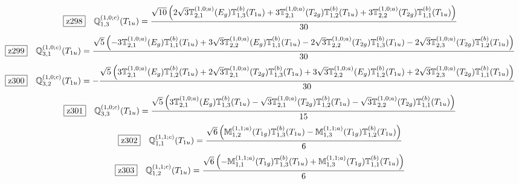 \documentclass[fleqn,10pt,landscape]{jsarticle}
\begin{document}
\begin{dmath*}
\hspace*{3mm}\fbox{z298}\quad \mathbb{Q}_{1,3}^{(1,0;c)}(T_{1u})=\frac{\sqrt{10} \left(2 \sqrt{3} \mathbb{T}_{2,1}^{(1,0;a)}(E_{g}) \mathbb{T}_{1,3}^{(b)}(T_{1u}) + 3 \mathbb{T}_{2,1}^{(1,0;a)}(T_{2g}) \mathbb{T}_{1,2}^{(b)}(T_{1u}) + 3 \mathbb{T}_{2,2}^{(1,0;a)}(T_{2g}) \mathbb{T}_{1,1}^{(b)}(T_{1u})\right)}{30}
\end{dmath*}
\begin{dmath*}
\hspace*{3mm}\fbox{z299}\quad \mathbb{Q}_{3,1}^{(1,0;c)}(T_{1u})=\frac{\sqrt{5} \left(- 3 \mathbb{T}_{2,1}^{(1,0;a)}(E_{g}) \mathbb{T}_{1,1}^{(b)}(T_{1u}) + 3 \sqrt{3} \mathbb{T}_{2,2}^{(1,0;a)}(E_{g}) \mathbb{T}_{1,1}^{(b)}(T_{1u}) - 2 \sqrt{3} \mathbb{T}_{2,2}^{(1,0;a)}(T_{2g}) \mathbb{T}_{1,3}^{(b)}(T_{1u}) - 2 \sqrt{3} \mathbb{T}_{2,3}^{(1,0;a)}(T_{2g}) \mathbb{T}_{1,2}^{(b)}(T_{1u})\right)}{30}
\end{dmath*}
\begin{dmath*}
\hspace*{3mm}\fbox{z300}\quad \mathbb{Q}_{3,2}^{(1,0;c)}(T_{1u})=- \frac{\sqrt{5} \left(3 \mathbb{T}_{2,1}^{(1,0;a)}(E_{g}) \mathbb{T}_{1,2}^{(b)}(T_{1u}) + 2 \sqrt{3} \mathbb{T}_{2,1}^{(1,0;a)}(T_{2g}) \mathbb{T}_{1,3}^{(b)}(T_{1u}) + 3 \sqrt{3} \mathbb{T}_{2,2}^{(1,0;a)}(E_{g}) \mathbb{T}_{1,2}^{(b)}(T_{1u}) + 2 \sqrt{3} \mathbb{T}_{2,3}^{(1,0;a)}(T_{2g}) \mathbb{T}_{1,1}^{(b)}(T_{1u})\right)}{30}
\end{dmath*}
\begin{dmath*}
\hspace*{3mm}\fbox{z301}\quad \mathbb{Q}_{3,3}^{(1,0;c)}(T_{1u})=\frac{\sqrt{5} \left(3 \mathbb{T}_{2,1}^{(1,0;a)}(E_{g}) \mathbb{T}_{1,3}^{(b)}(T_{1u}) - \sqrt{3} \mathbb{T}_{2,1}^{(1,0;a)}(T_{2g}) \mathbb{T}_{1,2}^{(b)}(T_{1u}) - \sqrt{3} \mathbb{T}_{2,2}^{(1,0;a)}(T_{2g}) \mathbb{T}_{1,1}^{(b)}(T_{1u})\right)}{15}
\end{dmath*}
\begin{dmath*}
\hspace*{3mm}\fbox{z302}\quad \mathbb{Q}_{1,1}^{(1,1;c)}(T_{1u})=\frac{\sqrt{6} \left(\mathbb{M}_{1,2}^{(1,1;a)}(T_{1g}) \mathbb{T}_{1,3}^{(b)}(T_{1u}) - \mathbb{M}_{1,3}^{(1,1;a)}(T_{1g}) \mathbb{T}_{1,2}^{(b)}(T_{1u})\right)}{6}
\end{dmath*}
\begin{dmath*}
\hspace*{3mm}\fbox{z303}\quad \mathbb{Q}_{1,2}^{(1,1;c)}(T_{1u})=\frac{\sqrt{6} \left(- \mathbb{M}_{1,1}^{(1,1;a)}(T_{1g}) \mathbb{T}_{1,3}^{(b)}(T_{1u}) + \mathbb{M}_{1,3}^{(1,1;a)}(T_{1g}) \mathbb{T}_{1,1}^{(b)}(T_{1u})\right)}{6}
\end{dmath*}
\end{document}
